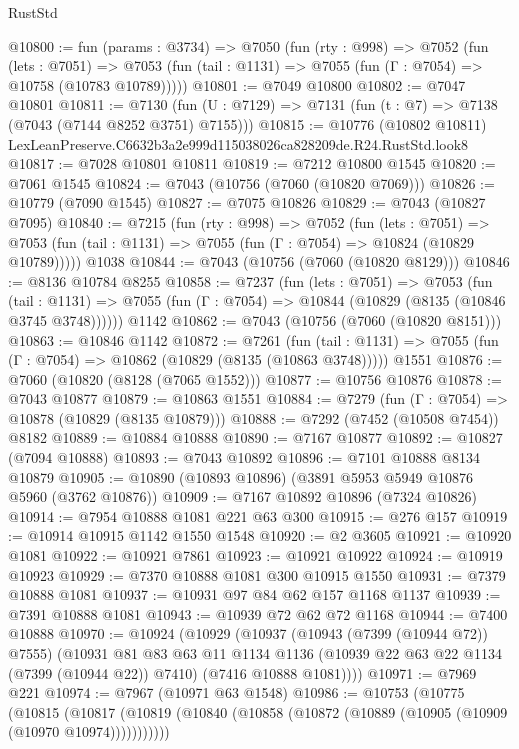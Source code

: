 \begin{lexlean}{RustStd}
\begin{coremodule}
@10800 := fun (params : @3734) =>
  @7050
    (fun (rty : @998) =>
    @7052
      (fun (lets : @7051) =>
      @7053 (fun (tail : @1131) => @7055 (fun (Γ : @7054) => @10758 (@10783 @10789)))))
@10801 := @7049 @10800
@10802 := @7047 @10801
@10811 := @7130 (fun (U : @7129) => @7131 (fun (t : @7) => @7138 (@7043 (@7144 @8252 @3751) @7155)))
@10815 := @10776 (@10802 @10811) LexLeanPreserve.C6632b3a2e999d115038026ca828209de.R24.RustStd.look8
@10817 := @7028 @10801 @10811
@10819 := @7212 @10800 @1545
@10820 := @7061 @1545
@10824 := @7043 (@10756 (@7060 (@10820 @7069)))
@10826 := @10779 (@7090 @1545)
@10827 := @7075 @10826
@10829 := @7043 (@10827 @7095)
@10840 := @7215
    (fun (rty : @998) =>
    @7052
      (fun (lets : @7051) =>
      @7053 (fun (tail : @1131) => @7055 (fun (Γ : @7054) => @10824 (@10829 @10789)))))
    @1038
@10844 := @7043 (@10756 (@7060 (@10820 @8129)))
@10846 := @8136 @10784 @8255
@10858 := @7237
    (fun (lets : @7051) =>
    @7053
      (fun (tail : @1131) =>
      @7055 (fun (Γ : @7054) => @10844 (@10829 (@8135 (@10846 @3745 @3748))))))
    @1142
@10862 := @7043 (@10756 (@7060 (@10820 @8151)))
@10863 := @10846 @1142
@10872 := @7261
    (fun (tail : @1131) => @7055 (fun (Γ : @7054) => @10862 (@10829 (@8135 (@10863 @3748)))))
    @1551
@10876 := @7060 (@10820 (@8128 (@7065 @1552)))
@10877 := @10756 @10876
@10878 := @7043 @10877
@10879 := @10863 @1551
@10884 := @7279 (fun (Γ : @7054) => @10878 (@10829 (@8135 @10879)))
@10888 := @7292 (@7452 (@10508 @7454)) @8182
@10889 := @10884 @10888
@10890 := @7167 @10877
@10892 := @10827 (@7094 @10888)
@10893 := @7043 @10892
@10896 := @7101 @10888 @8134 @10879
@10905 := @10890 (@10893 @10896) (@3891 @5953 @5949 @10876 @5960 (@3762 @10876))
@10909 := @7167 @10892 @10896 (@7324 @10826)
@10914 := @7954 @10888 @1081 @221 @63 @300
@10915 := @276 @157
@10919 := @10914 @10915 @1142 @1550 @1548
@10920 := @2 @3605
@10921 := @10920 @1081
@10922 := @10921 @7861
@10923 := @10921 @10922
@10924 := @10919 @10923
@10929 := @7370 @10888 @1081 @300 @10915 @1550
@10931 := @7379 @10888 @1081
@10937 := @10931 @97 @84 @62 @157 @1168 @1137
@10939 := @7391 @10888 @1081
@10943 := @10939 @72 @62 @72 @1168
@10944 := @7400 @10888
@10970 := @10924
    (@10929
      (@10937
        (@10943 (@7399 (@10944 @72)) @7555)
        (@10931
          @81
          @83
          @63
          @11
          @1134
          @1136
          (@10939 @22 @63 @22 @1134 (@7399 (@10944 @22)) @7410)
          (@7416 @10888 @1081))))
@10971 := @7969 @221
@10974 := @7967 (@10971 @63 @1548)
@10986 := @10753
    (@10775
      (@10815
        (@10817 (@10819 (@10840 (@10858 (@10872 (@10889 (@10905 (@10909 (@10970 @10974)))))))))))

\end{coremodule}
\end{lexlean}
